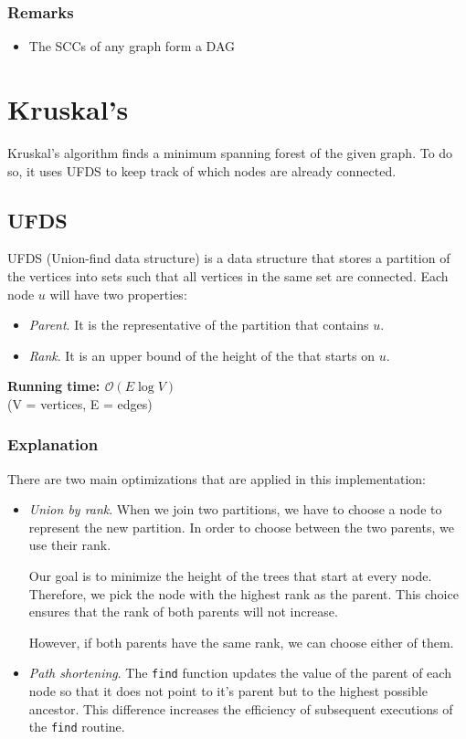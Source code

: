 \documentclass[12pt]{report}
\begin{document}
\subsubsection*{Remarks}
\begin{itemize}
	\item The SCCs of any graph form a DAG
\end{itemize}

\newpage
\section{Kruskal's}
Kruskal's algorithm finds a minimum spanning forest of the given graph. To do so, it
uses UFDS to keep track of which nodes are already connected.
\subsection{UFDS}
UFDS (Union-find data structure) is a data structure that stores a partition of 
the vertices into sets such that all vertices in the same set are connected.
Each node $u$ will have two properties:
\begin{itemize}
	\setlength\itemsep{0pt}
	\item \textit{Parent}. It is the representative of the partition that
		contains $u$.
	\item \textit{Rank}. It is an upper bound of the height of the 
		that starts on $u$. 
\end{itemize}
\noindent \textbf{\boldmath Running time: $\mathcal{O}(E\log V)$}
\\ {\small (V = vertices, E = edges)}
\subsubsection{Explanation}
There are two main optimizations that are applied in this implementation:
\begin{itemize}
	\item \textit{Union by rank}. When we join two partitions, we have to choose
		a node to represent the new partition. In order to choose between the 
		two parents, we use their rank. 

		Our goal is to minimize the height of the trees that start at every node.
		Therefore, we pick the node with the highest rank as the parent. This 
		choice ensures that the rank of both parents will not increase. 

		However, if both parents have the same rank, we can choose either of 
		them.
	\item \textit{Path shortening}. The \texttt{find} function updates the value 
		of the parent of each node so that it does not point to it's 
		 parent but to the highest possible ancestor. This
		difference increases the efficiency of subsequent executions of the 
		\texttt{find} routine. 
\end{itemize}
\end{document}
